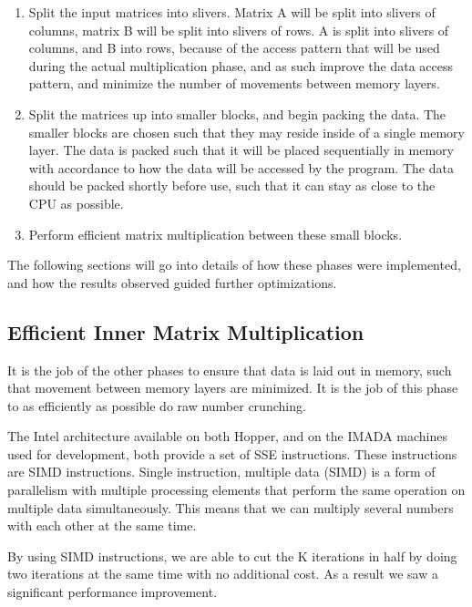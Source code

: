 \documentclass[a4paper,11pt,oneside]{book}
\begin{document}
\begin{enumerate}
  \item Split the input matrices into slivers. Matrix A will be split into 
  slivers of columns, matrix B will be split into slivers of rows. A is split
  into slivers of columns, and B into rows, because of the access pattern that
  will be used during the actual multiplication phase, and as such improve the
  data access pattern, and minimize the number of movements between memory
  layers.
  \item Split the matrices up into smaller blocks, and begin packing the data.
  The smaller blocks are chosen such that they may reside inside of a single
  memory layer. The data is packed such that it will be placed sequentially in
  memory with accordance to how the data will be accessed by the program. 
  The data should be packed shortly before use, such that it can stay as close 
  to the CPU as possible.
  \item Perform efficient matrix multiplication between these small blocks.
\end{enumerate}


The following sections will go into details of how these phases were
implemented, and how the results observed guided further optimizations.

\subsection{Efficient Inner Matrix Multiplication}

It is the job of the other phases to ensure that data is laid out in memory,
such that movement between memory layers are minimized. It is the job of this
phase to as efficiently as possible do raw number crunching.

The Intel architecture available on both Hopper, and on the IMADA machines used
for development, both provide a set of SSE instructions. These instructions are
SIMD instructions. Single instruction, multiple data (SIMD) is a form of
parallelism with multiple processing elements that perform the same operation on
multiple data simultaneously. This means that we can multiply several numbers
with each other at the same time. 

By using SIMD instructions, we are able to cut the K iterations in half by doing
two iterations at the same time with no additional cost. As a result we saw a
significant performance improvement. 
\end{document}
